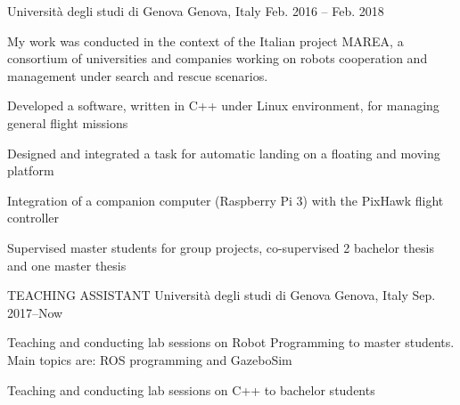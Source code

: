 \begin{cventries}
    {Università degli studi di Genova} %
    {Genova, Italy} %
    {Feb. 2016 – Feb. 2018} %
    {
      \begin{cvparagraph}
      My work was conducted in the context of the Italian project MAREA, a consortium of universities and companies working on robots cooperation and management under search and rescue scenarios.
      \end{cvparagraph}
      \begin{cvitems} %
        \item {Developed a software, written in C++ under Linux environment, for managing general flight missions}
        \item {Designed and integrated a task for  automatic landing on a floating and moving platform}
        \item {Integration of a companion computer (Raspberry Pi 3) with the PixHawk flight controller}
        \item {Supervised master students for group projects, co-supervised 2 bachelor thesis and one master thesis}
     \end{cvitems}
    }

  \cventry
    {TEACHING ASSISTANT} %
    {Università degli studi di Genova} %
    {Genova, Italy} %
    {Sep. 2017–Now} %
    {
      \begin{cvitems} %
        \item {Teaching and conducting lab sessions on Robot Programming to master students. Main topics are: ROS programming and GazeboSim}
        \item {Teaching and conducting lab sessions on C++ to bachelor students}
      \end{cvitems}
    }


\end{cventries}
